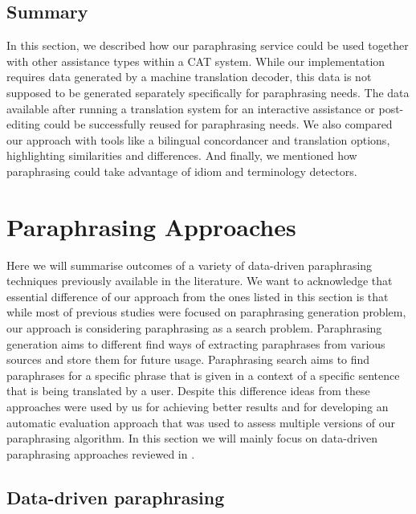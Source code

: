 \subsection{Summary}

In this section, we described how our paraphrasing service could be used together with other assistance types within a CAT system. While our implementation requires data generated by a machine translation decoder, this data is not supposed to be generated separately specifically for paraphrasing needs. The data available after running a translation system for an interactive assistance or post-editing could be successfully reused for paraphrasing needs. We also compared our approach with tools like a bilingual concordancer and translation options, highlighting similarities and differences. And finally, we mentioned how paraphrasing could take advantage of idiom and terminology detectors.

\section{Paraphrasing Approaches}

Here we will summarise outcomes of a variety of data-driven paraphrasing techniques previously available in the literature. We want to acknowledge that essential difference of our approach from the ones listed in this section is that while most of previous studies were focused on paraphrasing generation problem, our approach is considering paraphrasing as a search problem. Paraphrasing generation aims to different find ways of extracting paraphrases from various sources and store them for future usage. Paraphrasing search aims to find paraphrases for a specific phrase that is given in a context of a specific sentence that is being translated by a user. Despite this difference ideas from these approaches were used by us for achieving better results and for developing an automatic evaluation approach that was used to assess multiple versions of our paraphrasing algorithm. In this section we will mainly focus on data-driven paraphrasing approaches reviewed in \cite{Callison-Burch2007}. 

\subsection{Data-driven paraphrasing}

